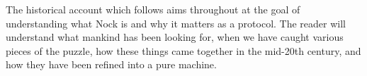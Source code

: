 The historical account which follows aims throughout at the goal of understanding what Nock is and why it matters as a protocol.  The reader will understand what mankind has been looking for, when we have caught various pieces of the puzzle, how these things came together in the mid-20th century, and how they have been refined into a pure machine.
